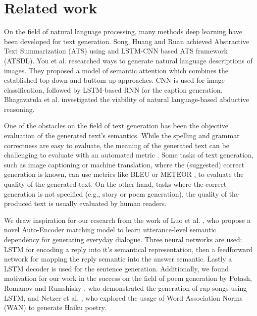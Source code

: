 \documentclass{acm_proc_article-sp}
\begin{document}
\section{Related work}

On the field of natural language processing, many methods deep learning have been developed for text generation. Song, Huang and Ruan \cite{song2019abstractive} achieved Abstractive Text Summarization (ATS) using and LSTM-CNN based ATS framework (ATSDL). You et al. \cite{You_2016_CVPR} researched ways to generate natural language descriptions of images. They proposed a model of semantic attention which combines the established top-down and buttom-up approaches. CNN is used for image classification, followed by LSTM-based RNN for the caption generation. Bhagavatula et al. \cite{bhagavatula2020abductive} investigated the viability of natural language-based abductive reasoning.

One of the obstacles on the field of text generation has been the objective evaluation of the generated text's semantics. While the spelling and grammar correctness are easy to evaluate, the meaning of the generated text can be challenging to evaluate with an automated metric \cite{celikyilmaz2020evaluation}. Some tasks of text generation, such as image captioning or machine translation, where the (suggested) correct generation is known, can use metrics like BLEU \cite{papineni2002bleu} or METEOR \cite{banerjee2005meteor}, to evaluate the quality of the generated text. On the other hand, tasks where the correct generation is not specified (e.g., story \cite{pawade2018story} or poem \cite{zhang2014chinese} generation), the quality of the produced text is usually evaluated by human readers.

We draw inspiration for our research from the work of Luo et al. \cite{luo2018autoencoder}, who propose a novel Auto-Encoder matching model to learn utterance-level semantic dependency for generating everyday dialogue. Three neural networks are used: LSTM for encoding a reply into it's semantical representation, then a feedforward network for mapping the reply semantic into the answer semantic. Lastly a LSTM decoder is used for the sentence generation. Additionally, we found motivation for our work in the success on the field of poem generation by Potash, Romanov and Rumshisky \cite{potash2015ghostwriter}, who demonstrated the generation of rap songs using LSTM, and Netzer et al. \cite{netzer2009gaiku}, who explored the usage of Word Association Norms (WAN) to generate Haiku poetry.
\end{document}
